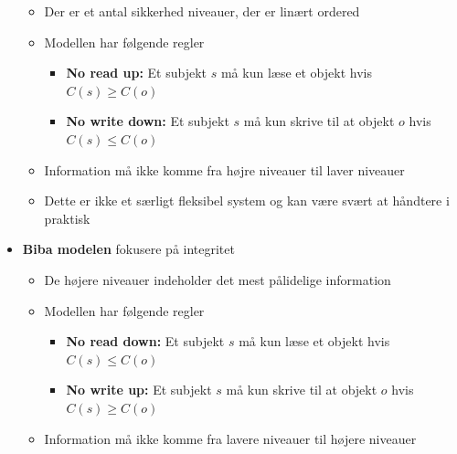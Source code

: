 \documentclass[a4, english]{article}
\begin{document}
\begin{itemize}
  \begin{itemize}
  	\item Der er et antal sikkerhed niveauer, der er linært ordered 
    \item Modellen har følgende regler
    \begin{itemize}
    	\item \textbf{No read up:} Et subjekt $s$ må kun læse et objekt hvis $C(s) \geq C(o)$ 
      \item \textbf{No write down:} Et subjekt $s$ må kun skrive til at objekt $o$ hvis $C(s) \leq C(o)$ 
    \end{itemize}
    \item Information må ikke komme fra højre niveauer til laver niveauer 
    \item Dette er ikke et særligt fleksibel system og kan være svært at håndtere i praktisk
  \end{itemize}
  \item \textbf{Biba modelen} fokusere på integritet 
  \begin{itemize}
  	\item De højere niveauer indeholder det mest pålidelige information
    \item Modellen har følgende regler
    \begin{itemize}
    	\item \textbf{No read down:} Et subjekt $s$ må kun læse et objekt hvis $C(s) \leq C(o)$ 
      \item \textbf{No write up:} Et subjekt $s$ må kun skrive til at objekt $o$ hvis $C(s) \geq C(o)$ 
    \end{itemize}
    \item Information må ikke komme fra lavere niveauer til højere niveauer  
  \end{itemize}
\end{itemize}
\end{document}
